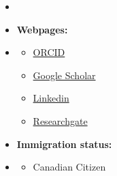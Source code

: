 \documentclass[12pt,oneside]{book}
\begin{document}
 \begin {itemize}
\item [] \phantom \quad  \item   []  {\bf  Webpages:} \vspace{-1.5em}
\item []  {\bf \hrulefill } \vspace{-1em}
\begin {itemize}
\item  \small \href{https://orcid.org/0000-0002-4116-0778 } {ORCID} 
\item \small \href{https://scholar.google.com/citations?user=bVzQEKkAAAAJ&hl=en&oi=ao  } { Google Scholar}
\item \small \href{https://www.linkedin.com/in/moslemheidarpur/   } {Linkedin}
\item \small \href{https://www.researchgate.net/profile/Moslem-Heidarpur/} {Researchgate}
\end{itemize}  \vspace{0.5em}
\item  []  {\bf  Immigration status:}  \vspace{-1.5em}
\item []  {\bf \hrulefill } \vspace{-1em}
\begin {itemize} \item \small Canadian Citizen
\end {itemize}   \vspace{0.5em}

\end{itemize}
\end{document}
